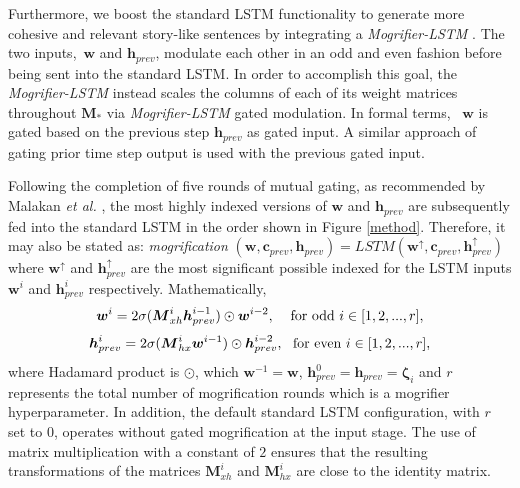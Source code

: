 \documentclass[runningheads]{llncs}
\begin{document}
Furthermore, we boost the standard LSTM functionality to generate more cohesive and relevant story-like sentences by integrating a {\em Mogrifier-LSTM} \cite{melis2019mogrifier}. The two inputs,~$\boldsymbol w$ and $\boldsymbol h_{prev}$, modulate each other in an odd and even fashion before being sent into the standard LSTM. In order to accomplish this goal, the {\em Mogrifier-LSTM} instead scales the columns of each of its weight matrices throughout $\boldsymbol M_*$ via {\em Mogrifier-LSTM} gated modulation. In formal terms, ~$\boldsymbol w$ is gated based on the previous step $\boldsymbol h_{prev}$ as gated input. A similar approach of gating prior time step output is used with the previous gated input. 



Following the completion of five rounds of mutual gating, as recommended by Malakan \textit{et al.} \cite{9647213}, the most highly indexed versions of $\boldsymbol w$ and $\boldsymbol h_{prev}$ are subsequently fed into  the standard LSTM in the order shown in Figure \ref{method}. Therefore, it may also be stated as: {\em mogrification} $(\boldsymbol w, \boldsymbol c_{prev}, \boldsymbol h_{prev}) = LSTM(\boldsymbol w^{\uparrow}, \boldsymbol c_{prev}, \boldsymbol h_{prev}^{\uparrow})$ where $\boldsymbol w^{\uparrow}$ and $\boldsymbol h_{prev}^{\uparrow}$ are the most significant possible indexed for the LSTM inputs $\boldsymbol w^i$ and $\boldsymbol h_{prev}^i$ respectively. Mathematically,
\begin{equation}
    \boldsymbol w^i = 2 \sigma (\boldsymbol M_{xh}^i \boldsymbol h_{prev}^{i-1}) \odot \boldsymbol w^{i-2}, \hspace{4mm} \text{\rm for~odd~} i \in [1,2,...,r],
\end{equation}
\vspace{-3mm}
\begin{equation}
    \boldsymbol h_{prev}^i = 2 \sigma (\boldsymbol M_{hx}^i \boldsymbol w^{i-1}) \odot \boldsymbol h_{prev}^{i-2}, \text{\rm ~~for~even~} i \in [1,2,...,r],
\end{equation}
where Hadamard product is $\odot$, which $\boldsymbol w^{-1} = \boldsymbol w$, $\boldsymbol h^0_{prev} = \boldsymbol h_{prev} = \boldsymbol \zeta_i$ and $r$ represents the total number of mogrification rounds which is a mogrifier hyperparameter. In addition, the default standard LSTM configuration, with $r$ set to $0$, operates without gated mogrification at the input stage. The use of matrix multiplication with a constant of $2$ ensures that the resulting transformations of the matrices $\boldsymbol M_{xh}^i$ and $\boldsymbol M_{hx}^i$ are close to the identity matrix.
\end{document}
